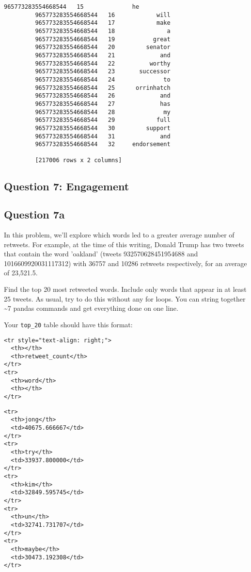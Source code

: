\documentclass[11pt]{article}
\begin{document}
\begin{Verbatim}[commandchars=\\\{\}]
         965773283554668544   15              he
         965773283554668544   16            will
         965773283554668544   17            make
         965773283554668544   18               a
         965773283554668544   19           great
         965773283554668544   20         senator
         965773283554668544   21             and
         965773283554668544   22          worthy
         965773283554668544   23       successor
         965773283554668544   24              to
         965773283554668544   25      orrinhatch
         965773283554668544   26             and
         965773283554668544   27             has
         965773283554668544   28              my
         965773283554668544   29            full
         965773283554668544   30         support
         965773283554668544   31             and
         965773283554668544   32     endorsement
         
         [217006 rows x 2 columns]
\end{Verbatim}
            
    \subsection{Question 7: Engagement}\label{question-7-engagement}

\subsection{Question 7a}\label{question-7a}

In this problem, we'll explore which words led to a greater average
number of retweets. For example, at the time of this writing, Donald
Trump has two tweets that contain the word 'oakland' (tweets
932570628451954688 and 1016609920031117312) with 36757 and 10286
retweets respectively, for an average of 23,521.5.

Find the top 20 most retweeted words. Include only words that appear in
at least 25 tweets. As usual, try to do this without any for loops. You
can string together \textasciitilde{}7 pandas commands and get
everything done on one line.

Your \texttt{top\_20} table should have this format:

\begin{verbatim}
<tr style="text-align: right;">
  <th></th>
  <th>retweet_count</th>
</tr>
<tr>
  <th>word</th>
  <th></th>
</tr>
\end{verbatim}

\begin{verbatim}
<tr>
  <th>jong</th>
  <td>40675.666667</td>
</tr>
<tr>
  <th>try</th>
  <td>33937.800000</td>
</tr>
<tr>
  <th>kim</th>
  <td>32849.595745</td>
</tr>
<tr>
  <th>un</th>
  <td>32741.731707</td>
</tr>
<tr>
  <th>maybe</th>
  <td>30473.192308</td>
</tr>
\end{verbatim}
\end{document}
